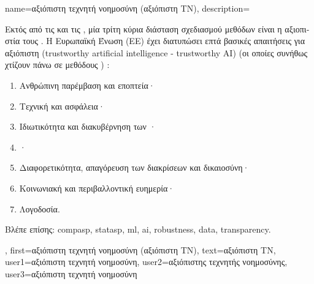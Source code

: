 {name={\foreignlanguage{greek}{αξιόπιστη τεχνητή νοημοσύνη (αξιόπιστη ΤΝ)}},
	description={\foreignlanguage{greek}{Εκτός από τις}  \foreignlanguage{greek}{και τις} , 
		\foreignlanguage{greek}{μία τρίτη κύρια διάσταση σχεδιασμού μεθόδων}  
		 \foreignlanguage{greek}{είναι η αξιοπιστία τους} 
		\cite{pfau2024engineeringtrustworthyaideveloper}. 
		\foreignlanguage{greek}{Η Ευρωπαϊκή Ένωση (ΕΕ) έχει διατυπώσει επτά βασικές απαιτήσεις για αξιόπιστη}  
		 (trustworthy artificial intelligence - trustworthy AI) \foreignlanguage{greek}{(οι οποίες συνήθως χτίζουν πάνω σε 
		μεθόδους} ) \cite{ALTAIEU}: 
		\begin{enumerate}[label=\arabic*)]
			\item \foreignlanguage{greek}{Ανθρώπινη παρέμβαση και εποπτεία·}
			\item \foreignlanguage{greek}{Τεχνική}  \foreignlanguage{greek}{και ασφάλεια·}
			\item \foreignlanguage{greek}{Ιδιωτικότητα και διακυβέρνηση των} ·
			\item {}·
			\item \foreignlanguage{greek}{Διαφορετικότητα, απαγόρευση των διακρίσεων και δικαιοσύνη·}
			\item \foreignlanguage{greek}{Κοινωνιακή και περιβαλλοντική ευημερία·}
			\item \foreignlanguage{greek}{Λογοδοσία.}
		\end{enumerate}
		\foreignlanguage{greek}{Βλέπε επίσης:} \gls{compasp}, \gls{statasp}, \gls{ml}, \gls{ai}, \gls{robustness}, \gls{data}, \gls{transparency}.},
	first={\foreignlanguage{greek}{αξιόπιστη τεχνητή νοημοσύνη (αξιόπιστη ΤΝ)}},
	text={\foreignlanguage{greek}{αξιόπιστη ΤΝ}},
	user1={\foreignlanguage{greek}{αξιόπιστη τεχνητή νοημοσύνη}}, %
  	user2={\foreignlanguage{greek}{αξιόπιστης τεχνητής νοημοσύνης}}, %
	user3={\foreignlanguage{greek}{αξιόπιστη τεχνητή νοημοσύνη}} %
}

